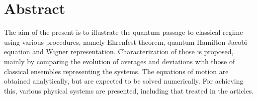 \chapter*{Abstract}

The aim of the present is to illustrate the quantum passage to classical regime using various procedures, namely Ehrenfest theorem, quantum Hamilton-Jacobi equation and Wigner representation. Characterization of those is proposed, mainly by comparing the evolution of averages and deviations with those of classical ensembles representing the systems. The equations of motion are obtained analytically, but are expected to be solved numerically. For achieving this, various physical systems are presented, including that treated in the articles. 
